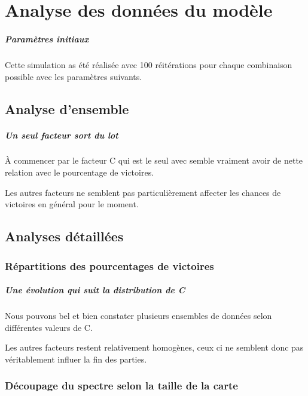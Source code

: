 \chapter{Analyse des données du modèle}

\paragraph{Paramètres initiaux}
Cette simulation as été réalisée avec 100 réitérations pour chaque combinaison possible avec les paramètres suivants.


\section{Analyse d'ensemble}


\paragraph{Un seul facteur sort du lot}
À commencer par le facteur C qui est le seul avec semble vraiment avoir de nette relation avec le pourcentage de victoires.

Les autres facteurs ne semblent pas particulièrement affecter les chances de victoires en général pour le moment.


\section{Analyses détaillées}
\subsection{Répartitions des pourcentages de victoires}

\paragraph{Une évolution qui suit la distribution de C}
Nous pouvons bel et bien constater plusieurs ensembles de données selon différentes valeurs de C.

Les autres facteurs restent relativement homogènes, ceux ci ne semblent donc pas véritablement influer la fin des parties.


\subsection{Découpage du spectre selon la taille de la carte}

